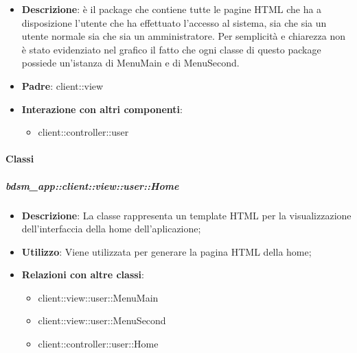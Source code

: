 \begin{itemize}
	\item \textbf{Descrizione}: è il package che contiene tutte le pagine HTML che ha a disposizione l'utente che ha effettuato l'accesso al sistema, sia che sia un utente normale sia che sia un amministratore. \newline
	Per semplicità e chiarezza non è stato evidenziato nel grafico il fatto che ogni classe di questo package possiede un'istanza di MenuMain e di MenuSecond.
	\item \textbf{Padre}: client::view
	\item \textbf{Interazione con altri componenti}:
		\begin{itemize}
			\item client::controller::user
		\end{itemize}
\end{itemize}

	\paragraph{Classi} %
		\subparagraph{bdsm\_app::client::view::user::Home} %
		\label{subp:bdsm_app_client_view_user_home}
			\begin{itemize}
				\item \textbf{Descrizione}: La classe rappresenta un template HTML per la visualizzazione dell'interfaccia della home dell'aplicazione;
				\item \textbf{Utilizzo}: Viene utilizzata per generare la pagina HTML della home;
				\item \textbf{Relazioni con altre classi}: 		
					\begin{itemize}
						\item client::view::user::MenuMain
						\item client::view::user::MenuSecond
						\item client::controller::user::Home
					\end{itemize}
			\end{itemize}

